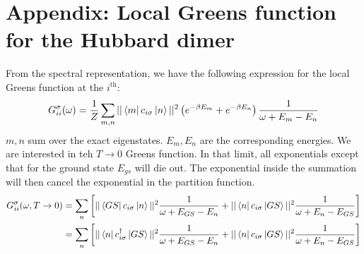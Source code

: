 \documentclass[12pt]{article}
\numberwithin{equation}{section}
\begin{document}
\section*{Appendix: Local Greens function for the Hubbard dimer}
From the spectral representation, we have the following expression for the local Greens function at the $i^\text{th}$:
\begin{equation}\begin{aligned}
	G_{i i}^\sigma(\omega) = \frac{1}{Z}\sum_{m,n}||\bra{m}c_{i\sigma}\ket{n}||^2\left( e^{-\beta E_m} + e^{-\beta E_n}\right)\frac{1}{\omega + E_m - E_n}
\end{aligned}\end{equation}
$m,n$ sum over the exact eigenstates. $E_m, E_n$ are the corresponding energies. We are interested in teh $T \to 0$ Greens function. In that limit, all exponentials except that for the ground state $E_{gs}$ will die out. The exponential inside the summation will then cancel the exponential in the partition function.
\begin{equation}\begin{aligned}
	G_{i i}^\sigma(\omega, T \to 0) &= \sum_{n}\left[||\bra{GS}c_{i\sigma}\ket{n}||^2\frac{1}{\omega + E_{GS} - E_n} + ||\bra{n}c_{i\sigma}\ket{GS}||^2\frac{1}{\omega + E_n - E_{GS}}\right]\\
					&= \sum_{n}\left[||\bra{n}c^\dagger_{i\sigma}\ket{GS}||^2\frac{1}{\omega + E_{GS} - E_n} + ||\bra{n}c_{i\sigma}\ket{GS}||^2\frac{1}{\omega + E_n - E_{GS}}\right]\\
\end{aligned}\end{equation}
\end{document}
